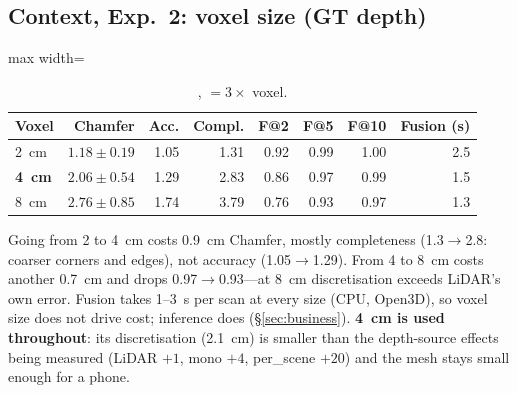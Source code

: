 \subsection{Context, Exp.~2: voxel size (GT depth)}\label{sec:voxel}
\begin{table}[h]
\centering\small
\caption{,  $=3\times$ voxel.}
\begin{adjustbox}{max width=\columnwidth}
\begin{tabular}{@{}lrrrrrrr@{}}
\toprule
Voxel & Chamfer & Acc. & Compl. & F@2 & F@5 & F@10 & Fusion (s) \\
\midrule
\SI{2}{cm} & $1.18 \pm 0.19$ & 1.05 & 1.31 & 0.92 & 0.99 & 1.00 & 2.5 \\
\textbf{\SI{4}{cm}} & $2.06 \pm 0.54$ & 1.29 & 2.83 & 0.86 & 0.97 & 0.99 & 1.5 \\
\SI{8}{cm} & $2.76 \pm 0.85$ & 1.74 & 3.79 & 0.76 & 0.93 & 0.97 & 1.3 \\
\bottomrule
\end{tabular}
\end{adjustbox}
\end{table}
Going from 2 to \SI{4}{cm} costs \SI{0.9}{cm} Chamfer, mostly completeness (1.3$\rightarrow$2.8: coarser corners and
edges), not accuracy (1.05$\rightarrow$1.29). From 4 to \SI{8}{cm} costs another \SI{0.7}{cm} and \fscore{} drops
0.97$\rightarrow$0.93---at \SI{8}{cm} discretisation exceeds LiDAR's own error. Fusion takes 1--\SI{3}{s} per scan at
every size (CPU, Open3D), so voxel size does not drive cost; inference does (\S\ref{sec:business}). \textbf{\SI{4}{cm}
is used throughout}: its discretisation (\SI{2.1}{cm}) is smaller than the depth-source effects being measured (LiDAR
$+1$, mono $+4$, per\_scene $+20$) and the mesh stays small enough for a phone.

